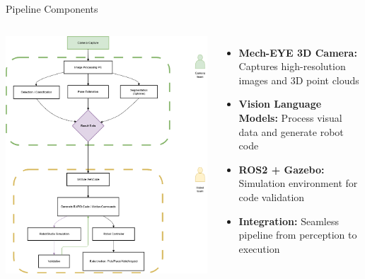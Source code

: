 \documentclass{beamer}
\begin{document}
\begin{frame}{Pipeline Components}
    \begin{columns}
        \centering
        \includegraphics[width=\textwidth]{flow.png}
        \begin{itemize}
            \item \textbf{Mech-EYE 3D Camera:} Captures high-resolution images and 3D point clouds
            \item \textbf{Vision Language Models:} Process visual data and generate robot code
            \item \textbf{ROS2 + Gazebo:} Simulation environment for code validation
            \item \textbf{Integration:} Seamless pipeline from perception to execution
        \end{itemize}
    \end{columns}
\end{frame}
\end{document}
